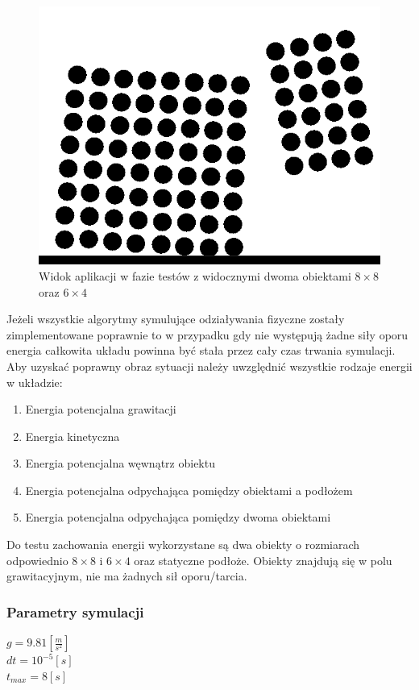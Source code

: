 \documentclass[12pt, letterpaper]{report}
\begin{document}
    \begin{figure}
        \includegraphics[width=0.9\linewidth]{objects_raw} 
        \caption{Widok aplikacji w fazie testów z widocznymi dwoma obiektami $8 \times 8$ oraz $6 \times 4$}
        \label{fig:wrapfig}
    \end{figure}
    Jeżeli wszystkie algorytmy symulujące odziaływania fizyczne zostały zimplementowane poprawnie 
    to w przypadku gdy nie występują żadne siły oporu energia całkowita układu powinna 
    być stała przez cały czas trwania symulacji. 
    Aby uzyskać poprawny obraz sytuacji należy uwzględnić
    wszystkie rodzaje energii w układzie: 
    \begin{enumerate}
        \item Energia potencjalna grawitacji
        \item Energia kinetyczna
        \item Energia potencjalna węwnątrz obiektu
        \item Energia potencjalna odpychająca pomiędzy obiektami a podłożem
        \item Energia potencjalna odpychająca pomiędzy dwoma obiektami
    \end{enumerate}
    Do testu zachowania energii wykorzystane są 
    dwa obiekty o rozmiarach odpowiednio $8 \times 8$ i $6 \times 4$ oraz statyczne podłoże. Obiekty
    znajdują się w polu grawitacyjnym, nie ma żadnych sił oporu/tarcia.

    \subsubsection{Parametry symulacji}
    $g = 9.81 [\frac{m}{s^2}]$\\
    $dt = 10^{-5} [s]$\\
    $t_{max} = 8 [s]$\\ \\ \\ \\
\end{document}
